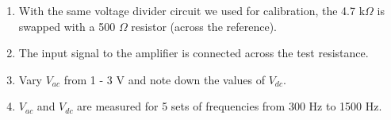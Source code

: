 \begin{enumerate}
    \item With the same voltage divider circuit we used for calibration, the 4.7 k$\Omega$ is swapped with a 500 $\Omega$ resistor (across the reference).
    \item The input signal to the amplifier is connected across the test resistance.
    \item Vary $V_{ac}$ from 1 - 3 V and note down the values of $V_{dc}$.
    \item $V_{ac}$ and $V_{dc}$ are measured for 5 sets of frequencies from 300 Hz to 1500 Hz.\\
\end{enumerate}

